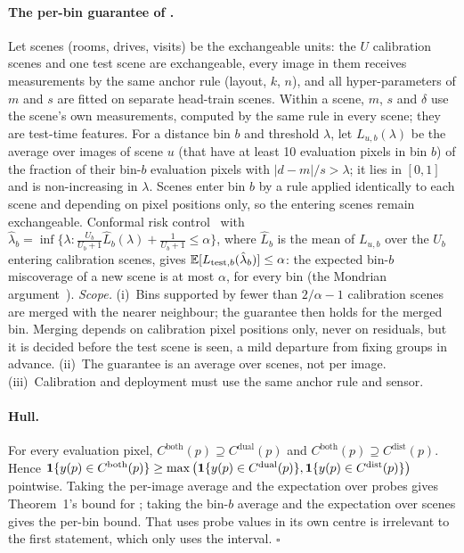 \documentclass[10pt,twocolumn,letterpaper]{article}
\begin{document}
\paragraph{The per-bin guarantee of \mDistSplit.}
Let scenes (rooms, drives, visits) be the exchangeable units: the $U$ calibration scenes and one test scene are exchangeable, every image in them receives measurements by the same anchor rule (layout, $k$, $n$), and all hyper-parameters of $m$ and $s$ are fitted on separate head-train scenes.
Within a scene, $m$, $s$ and $\delta$ use the scene's own measurements, computed by the same rule in every scene; they are test-time features.
For a distance bin $b$ and threshold $\lambda$, let $L_{u,b}(\lambda)$ be the average over images of scene $u$ (that have at least 10 evaluation pixels in bin $b$) of the fraction of their bin-$b$ evaluation pixels with $|d-m|/s>\lambda$; it lies in $[0,1]$ and is non-increasing in $\lambda$.
Scenes enter bin $b$ by a rule applied identically to each scene and depending on pixel positions only, so the entering scenes remain exchangeable.
Conformal risk control~\cite{angelopoulos2024crc} with
$\hat\lambda_b=\inf\{\lambda:\frac{U_b}{U_b+1}\hat L_b(\lambda)+\frac{1}{U_b+1}\le\alpha\}$, where $\hat L_b$ is the mean of $L_{u,b}$ over the $U_b$ entering calibration scenes, gives $\mathbb{E}[L_{\text{test},b}(\hat\lambda_b)]\le\alpha$: the expected bin-$b$ miscoverage of a new scene is at most $\alpha$, for every bin (the Mondrian argument~\cite{vovk2005alrw}).
\emph{Scope.} (i)~Bins supported by fewer than $2/\alpha-1$ calibration scenes are merged with the nearer neighbour; the guarantee then holds for the merged bin. Merging depends on calibration pixel positions only, never on residuals, but it is decided before the test scene is seen, a mild departure from fixing groups in advance. (ii)~The guarantee is an average over scenes, not per image. (iii)~Calibration and deployment must use the same anchor rule and sensor.

\paragraph{Hull.}
For every evaluation pixel, $C^{\text{both}}(p)\supseteq C^{\text{dual}}(p)$ and $C^{\text{both}}(p)\supseteq C^{\text{dist}}(p)$. Hence $\mathbf{1}\{y(p)\in C^{\text{both}}(p)\}\ge\max\big(\mathbf{1}\{y(p)\in C^{\text{dual}}(p)\},\mathbf{1}\{y(p)\in C^{\text{dist}}(p)\}\big)$ pointwise.
Taking the per-image average and the expectation over probes gives Theorem~1's bound for \mDualBoth; taking the bin-$b$ average and the expectation over scenes gives the per-bin bound.
That \mDistSplit uses probe values in its own centre is irrelevant to the first statement, which only uses the \mDual interval. \hfill$\square$
\end{document}
